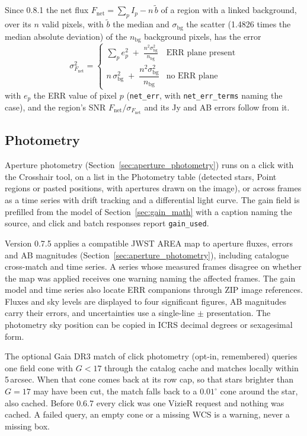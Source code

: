\documentclass[11pt,a4paper]{article}
\newcommand{\code}[1]{\texttt{\small #1}}
\begin{document}
    Since 0.8.1 the net flux $F_{\text{net}} = \sum_p I_p - n\,\tilde{b}$ of a region with a linked background, over its $n$ valid pixels, with $\tilde{b}$ the median and $\sigma_{\text{bg}}$ the scatter (1.4826 times the median absolute deviation) of the $n_{\text{bg}}$ background pixels, has the error
    \begin{equation}
        \sigma^2_{F_{\text{net}}} =
        \begin{cases}
            \displaystyle\sum_{p} e_p^2 \;+\; \frac{n^2 \sigma^2_{\text{bg}}}{n_{\text{bg}}} & \text{ERR plane present} \\[10pt]
            n\,\sigma^2_{\text{bg}} \;+\; \dfrac{n^2 \sigma^2_{\text{bg}}}{n_{\text{bg}}} & \text{no ERR plane}
        \end{cases}
    \end{equation}
    with $e_p$ the ERR value of pixel $p$ (\code{net\_err}, with \code{net\_err\_terms} naming the case), and the region's SNR $F_{\text{net}} / \sigma_{F_{\text{net}}}$ and its Jy and AB errors follow from it.

    \subsection{Photometry}

    Aperture photometry (Section~\ref{sec:aperture_photometry}) runs on a click with the Crosshair tool, on a list in the Photometry table (detected stars, Point regions or pasted positions, with apertures drawn on the image), or across frames as a time series with drift tracking and a differential light curve. The gain field is prefilled from the model of Section~\ref{sec:gain_math} with a caption naming the source, and click and batch responses report \code{gain\_used}.

    Version 0.7.5 applies a compatible JWST AREA map to aperture fluxes, errors and AB magnitudes (Section~\ref{sec:aperture_photometry}), including catalogue cross-match and time series. A series whose measured frames disagree on whether the map was applied receives one warning naming the affected frames. The gain model and time series also locate ERR companions through ZIP image references. Fluxes and sky levels are displayed to four significant figures, AB magnitudes carry their errors, and uncertainties use a single-line $\pm$ presentation. The photometry sky position can be copied in ICRS decimal degrees or sexagesimal form.

    The optional Gaia DR3 match of click photometry (opt-in, remembered) queries one field cone with $G < 17$ through the catalog cache and matches locally within 5\,arcsec. When that cone comes back at its row cap, so that stars brighter than $G = 17$ may have been cut, the match falls back to a $0.01^{\circ}$ cone around the star, also cached. Before 0.6.7 every click was one VizieR request and nothing was cached. A failed query, an empty cone or a missing WCS is a warning, never a missing box.
\end{document}
